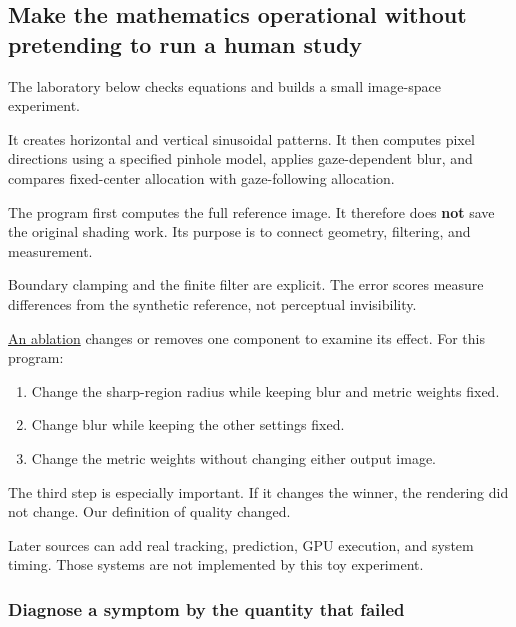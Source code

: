 \subsection{Make the mathematics operational without pretending to run a human study}\label{04-visual-computing-ii-ch042-make-the-mathematics-operational-without-pretending-to-run-a-human-study}

\hypertarget{04-visual-computing-ii-ch042-make-the-mathematics-operational-without-pretending-to-run-a-human-study}{}

The laboratory below checks equations and builds a small image-space experiment.

It creates horizontal and vertical sinusoidal patterns. It then computes pixel directions using a specified pinhole model, applies gaze-dependent blur, and compares fixed-center allocation with gaze-following allocation.

The program first computes the full reference image. It therefore does \textbf{not} save the original shading work. Its purpose is to connect geometry, filtering, and measurement.

Boundary clamping and the finite filter are explicit. The error scores measure differences from the synthetic reference, not perceptual invisibility.

\hyperref[appendix-65788587ef78]{An ablation} changes or removes one component to examine its effect. For this program:

\begin{enumerate}
\def\labelenumi{\arabic{enumi}.}
\tightlist
\item
  Change the sharp-region radius while keeping blur and metric weights fixed.
\item
  Change blur while keeping the other settings fixed.
\item
  Change the metric weights without changing either output image.
\end{enumerate}

The third step is especially important. If it changes the winner, the rendering did not change. Our definition of quality changed.

Later sources can add real tracking, prediction, GPU execution, and system timing. Those systems are not implemented by this toy experiment.

\subsubsection{Diagnose a symptom by the quantity that failed}\label{04-visual-computing-ii-ch042-diagnose-a-symptom-by-the-quantity-that-failed}


